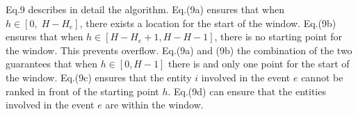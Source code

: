 Eq.9 describes in detail the algorithm. Eq.(9a) ensures that when $h\in [0,\;H-H_e]$, there exists a location for the start of the window. Eq.(9b) ensures that when $h\in [H-H_e+1,H-H-1]$, there is no starting point for the window. This prevents overflow. Eq.(9a) and (9b) the combination of the two guarantees that when $h\in [0, H-1]$ there is and only one point for the start of the window. Eq.(9c) ensures that the entity $i$ involved in the event $e$ cannot be ranked in front of the starting point $h$. Eq.(9d) can ensure that the entities involved in the event $e$ are within the window.


